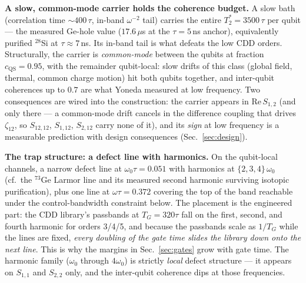 \documentclass[10pt]{article}
\newcommand{\TG}{T_G}
\begin{document}
\textbf{A slow, common-mode carrier holds the coherence budget.} A slow bath
(correlation time $\sim 400\,\tau$, in-band $\omega^{-2}$ tail) carries the
entire $T_2^{*} = 3500\,\tau$ per qubit --- the measured Ge-hole value
($17.6\,\mu$s at the $\tau = 5$\,ns anchor), equivalently purified
$^{28}$Si at $\tau \approx 7$\,ns. Its in-band tail is what defeats the low
CDD orders. Structurally, the carrier is \emph{common-mode} between the
qubits at fraction $c_{\mathrm{QS}} = 0.95$, with the remainder qubit-local:
slow drifts of this class (global field, thermal, common charge motion) hit
both qubits together, and inter-qubit coherences up to $0.7$ are what Yoneda
measured at low frequency. Two consequences are wired into the construction:
the carrier appears in $\mathrm{Re}\,S_{1,2}$ (and only there --- a
common-mode drift cancels in the difference coupling that drives
$\zeta_{12}$, so $S_{12,12}$, $S_{1,12}$, $S_{2,12}$ carry none of it), and
its \emph{sign} at low frequency is a measurable prediction with design
consequences (Sec.~\ref{sec:design}).

\textbf{The trap structure: a defect line with harmonics.} On the qubit-local
channels, a narrow defect line at $\omega_0\tau = 0.051$ with harmonics at
$\{2,3,4\}\,\omega_0$ (cf.\ the $^{73}$Ge Larmor line and its measured second
harmonic surviving isotopic purification), plus one line at
$\omega\tau = 0.372$ covering the top of the band reachable under the
control-bandwidth constraint below. The placement is the engineered part: the
CDD library's passbands at $\TG = 320\tau$ fall on the first, second, and
fourth harmonic for orders 3/4/5, and because the passbands scale as $1/\TG$
while the lines are fixed, \emph{every doubling of the gate time slides the
library down onto the next line}. This is why the margins in
Sec.~\ref{sec:gates} grow with gate time. The harmonic family
($\omega_0$ through $4\omega_0$) is strictly \emph{local} defect structure ---
it appears on $S_{1,1}$ and $S_{2,2}$ only, and the inter-qubit coherence dips
at those frequencies.
\end{document}
